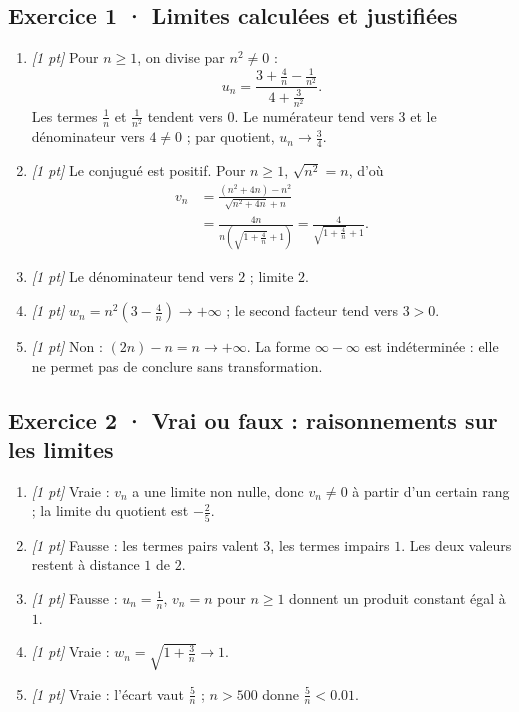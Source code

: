 \subsection*{Exercice 1 · Limites calculées et justifiées}\begin{enumerate}

\item \textit{[1 pt]} Pour $n\ge1$, on divise par $n^2\ne0$ :
\[u_n=\frac{3+\frac{4}{n}-\frac{1}{n^2}}{4+\frac{3}{n^2}}.\]
Les termes $\frac{1}{n}$ et $\frac{1}{n^2}$ tendent vers $0$. Le numérateur tend vers $3$ et le dénominateur vers $4\ne0$ ; par quotient, $u_n\to\frac{3}{4}$.

\item \textit{[1 pt]} Le conjugué est positif. Pour $n\ge1$, $\sqrt{n^2}=n$, d'où
\[\begin{aligned}v_n&=\frac{(n^2+4n)-n^2}{\sqrt{n^2+4n}+n}\\&=\frac{4n}{n(\sqrt{1+\frac{4}{n}}+1)}=\frac{4}{\sqrt{1+\frac{4}{n}}+1}.\end{aligned}\]

\item \textit{[1 pt]} Le dénominateur tend vers $2$ ; limite $2$.

\item \textit{[1 pt]} $w_n=n^2(3-\frac{4}{n})\to+\infty$ ; le second facteur tend vers $3>0$.

\item \textit{[1 pt]} Non : $(2n)-n=n\to+\infty$. La forme $\infty-\infty$ est indéterminée : elle ne permet pas de conclure sans transformation.

\end{enumerate}

\subsection*{Exercice 2 · Vrai ou faux : raisonnements sur les limites}\begin{enumerate}

\item \textit{[1 pt]} Vraie : $v_n$ a une limite non nulle, donc $v_n\ne0$ à partir d'un certain rang ; la limite du quotient est $-\frac{2}{5}$.

\item \textit{[1 pt]} Fausse : les termes pairs valent $3$, les termes impairs $1$. Les deux valeurs restent à distance $1$ de $2$.

\item \textit{[1 pt]} Fausse : $u_n=\frac{1}{n}$, $v_n=n$ pour $n\ge1$ donnent un produit constant égal à $1$.

\item \textit{[1 pt]} Vraie : $w_n=\sqrt{1+\frac{3}{n}}\to1$.

\item \textit{[1 pt]} Vraie : l'écart vaut $\frac{5}{n}$ ; $n>500$ donne $\frac{5}{n}<\num{0,01}$.

\end{enumerate}

